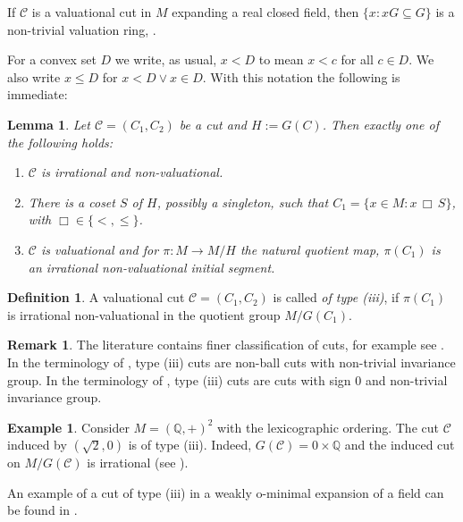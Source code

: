 \documentclass[11pt]{amsart}
\newtheorem{lemma}[theorem]{Lemma}
\theoremstyle{definition}
\newtheorem{definition}[theorem]{Definition}
\newtheorem{example}[theorem]{Example}
\newtheorem{remark}[theorem]{Remark}
\newcommand{\CC}{{\mathcal C}}
\newcommand{\0}{\emptyset}
\def\sub{\subseteq}
\begin{document}
   If $\CC$ is a valuational cut in $M$ expanding a real closed field, then $\{x: xG\sub G\}$ is a non-trivial valuation ring, \cite[Lemma 6.2]{MacMaSt}. 
   

For a convex set $D$ we write, as usual, $x<D$ to mean $x<c$ for all $c\in D$.  We also write $x\le D$ for $x<D\vee x\in D$. With this notation the following is immediate: 

\begin{lemma}\label{L:all cuts}
	Let $\CC=(C_1,C_2)$ be  a cut and  $H:=G(C)$. Then exactly one of the following holds:
\begin{enumerate}
    \item[(i)] $\CC$ is  irrational and non-valuational.
    \item[(ii)] There is a coset $S$ of $H$, possibly a singleton, such that $C_1=\{x\in M:x\,\Box\, S\}$, with $\Box\in \{<,\leq\}$. 
    \item[(iii)] $\CC$ is valuational  and for $\pi:M\to M/H$ the natural quotient map, $\pi(C_1)$ is an irrational non-valuational initial segment. 
\end{enumerate}	
\end{lemma}
 

\begin{definition}
	A valuational cut $\CC=(C_1,C_2)$ is called \textit{of type (iii)}, if $\pi(C_1)$ is irrational non-valuational in the quotient group $M/G(C_1)$.
\end{definition}

\begin{remark}
    The literature contains finer classification of cuts, for example see \cite[Figure 1]{FVKNar}. In the terminology of \cite{FVKNar}, type (iii) cuts are non-ball cuts with non-trivial invariance group. In the terminology of \cite{Tressl}, type (iii) cuts are cuts with sign $0$ and non-trivial invariance group.
\end{remark}

\begin{example}
    Consider $M=(\mathbb{Q},+)^2$ with the lexicographic ordering. The cut $\mathcal{C}$ induced by $(\sqrt{2},0)$ is of type (iii). Indeed, $G(\mathcal{C})=0\times\mathbb{Q}$ and the induced cut on $M/G(\mathcal{C})$ is irrational (see \cite[Ex3]{FVKNar}).

    An example of a cut of type (iii) in a weakly o-minimal expansion of a field can be found in \cite[Example 3.11(C)]{Tressl-modcomp}.
\end{example}
\end{document}
